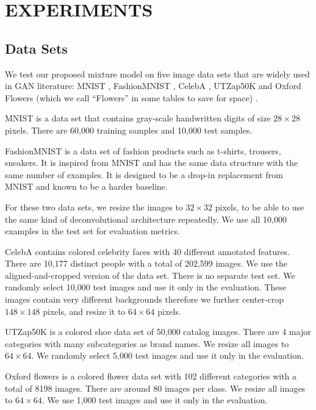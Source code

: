 \documentclass[a4paper,onesided,12pt]{report}
\begin{document}
\chapter{EXPERIMENTS}
\label{chapter:exps}

\section{Data Sets}
\label{sec:datasets}
We test our proposed mixture model on five image data sets that are widely used in GAN literature: MNIST \cite{mnist}, FashionMNIST \cite{fashion}, CelebA \cite{celeba},  UTZap50K \cite{utzap50k} and Oxford Flowers (which we call ``Flowers'' in some tables to save for space) \cite{flowers}.

MNIST is a data set that contains gray-scale handwritten digits of size $28 \times 28$ pixels. There are 60,000 training samples and 10,000 test samples.

FashionMNIST is a data set of fashion products such as t-shirts, trousers, sneakers. It is inspired from MNIST and has the same data structure with the same number of examples. It is designed to be a drop-in replacement from MNIST and known to be a harder baseline.

For these two data sets, we resize the images to $32 \times 32$ pixels, to be able to use the same kind of deconvolutional architecture repeatedly. We use all 10,000 examples in the test set for evaluation metrics.

CelebA contains colored celebrity faces with 40 different annotated features. There are 10,177 distinct people with a total of 202,599 images. We use the aligned-and-cropped version of the data set. There is no separate test set. We randomly select 10,000 test images and use it only in the evaluation. These images contain very different backgrounds therefore we further center-crop $148 \times 148$ pixels, and resize it to $64 \times 64$ pixels.

UTZap50K is a colored shoe data set of 50,000 catalog images. There are 4 major categories with many subcategories as brand names. We resize all images to $64 \times 64$. We randomly select 5,000 test images and use it only in the evaluation.

Oxford flowers is a colored flower data set with 102 different categories with a total of 8198 images. There are around 80 images per class. We resize all images to $64 \times 64$. We use 1,000 test images and use it only in the evaluation.
\end{document}
